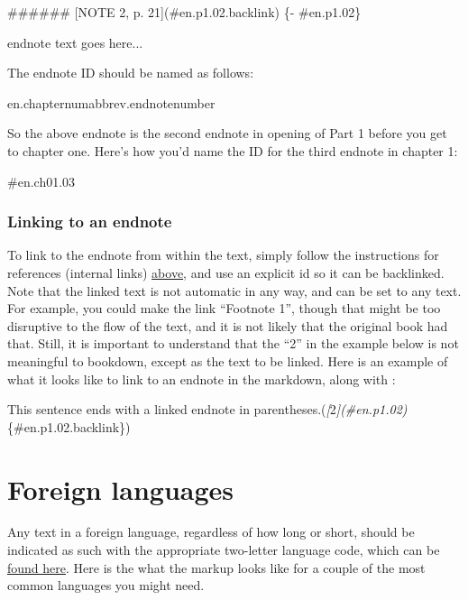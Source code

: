 \documentclass[
]{book}
\newenvironment{Shaded}{\begin{snugshade}}{\end{snugshade}}
\newcommand{\CommentTok}[1]{\textcolor[rgb]{0.56,0.35,0.01}{\textit{#1}}}
\newcommand{\FunctionTok}[1]{\textcolor[rgb]{0.00,0.00,0.00}{#1}}
\newcommand{\NormalTok}[1]{#1}
\newcommand{\OtherTok}[1]{\textcolor[rgb]{0.56,0.35,0.01}{#1}}
\begin{document}
\begin{Shaded}
\begin{Highlighting}[]
\FunctionTok{\#\#\#\#\#\# [NOTE 2, p. 21](\#en.p1.02.backlink) \{{-} \#en.p1.02\}}

\NormalTok{endnote text goes here...}
\end{Highlighting}
\end{Shaded}

The endnote ID should be named as follows:

en.chapternumabbrev.endnotenumber

So the above endnote is the second endnote in opening of Part 1 before you get to chapter one. Here's how you'd name the ID for the third endnote in chapter 1:

\#en.ch01.03

\hypertarget{linking-to-an-endnote}{%
\subsection{Linking to an endnote}\label{linking-to-an-endnote}}

To link to the endnote from within the text, simply follow the instructions for references (internal links) \protect\hyperlink{references}{above}, and use an explicit id so it can be backlinked. Note that the linked text is not automatic in any way, and can be set to any text. For example, you could make the link ``Footnote 1'', though that might be too disruptive to the flow of the text, and it is not likely that the original book had that. Still, it is important to understand that the ``2'' in the example below is not meaningful to bookdown, except as the text to be linked. Here is an example of what it looks like to link to an endnote in the markdown, along with :

\begin{Shaded}
\begin{Highlighting}[]
\NormalTok{This sentence ends with a linked endnote in parentheses.(}\CommentTok{[}\OtherTok{2}\CommentTok{](\#en.p1.02)}\NormalTok{\{\#en.p1.02.backlink\})}
\end{Highlighting}
\end{Shaded}

\hypertarget{foreign-languages}{%
\chapter{Foreign languages}\label{foreign-languages}}

Any text in a foreign language, regardless of how long or short, should be indicated as such with the appropriate two-letter language code, which can be \href{https://www.w3schools.com/tags/ref_language_codes.asp}{found here}. Here is the what the markup looks like for a couple of the most common languages you might need.
\end{document}
